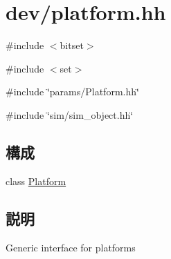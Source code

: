 \hypertarget{platform_8hh}{
\section{dev/platform.hh}
\label{platform_8hh}
}
{\ttfamily \#include $<$bitset$>$}\par
{\ttfamily \#include $<$set$>$}\par
{\ttfamily \#include \char`\"{}params/Platform.hh\char`\"{}}\par
{\ttfamily \#include \char`\"{}sim/sim\_\-object.hh\char`\"{}}\par
\subsection*{構成}
\begin{DoxyCompactItemize}
\item 
class \hyperlink{classPlatform}{Platform}
\end{DoxyCompactItemize}


\subsection{説明}
Generic interface for platforms 